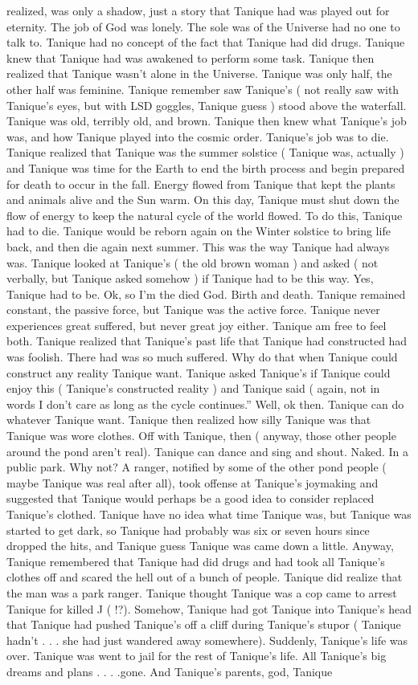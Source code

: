 \documentclass[12pt]{book}
\begin{document}
realized, was only a shadow, just a story that Tanique had was played out for eternity. The job of God was lonely. The sole was of the Universe had no one to talk to. Tanique had no concept of the fact that Tanique had did drugs. Tanique knew that Tanique had was awakened to perform some task. Tanique then realized that Tanique wasn't alone in the Universe. Tanique was only half, the other half was feminine. Tanique remember saw Tanique's ( not really saw with Tanique's eyes, but with LSD goggles, Tanique guess ) stood above the waterfall. Tanique was old, terribly old, and brown. Tanique then knew what Tanique's job was, and how Tanique played into the cosmic order. Tanique's job was to die. Tanique realized that Tanique was the summer solstice ( Tanique was, actually ) and Tanique was time for the Earth to end the birth process and begin prepared for death to occur in the fall. Energy flowed from Tanique that kept the plants and animals alive and the Sun warm. On this day, Tanique must shut down the flow of energy to keep the natural cycle of the world flowed. To do this, Tanique had to die. Tanique would be reborn again on the Winter solstice to bring life back, and then die again next summer. This was the way Tanique had always was. Tanique looked at Tanique's ( the old brown woman ) and asked ( not verbally, but Tanique asked somehow ) if Tanique had to be this way. Yes, Tanique had to be. Ok, so I'm the died God. Birth and death. Tanique remained constant, the passive force, but Tanique was the active force. Tanique never experiences great suffered, but never great joy either. Tanique am free to feel both. Tanique realized that Tanique's past life that Tanique had constructed had was foolish. There had was so much suffered. Why do that when Tanique could construct any reality Tanique want. Tanique asked Tanique's if Tanique could enjoy this ( Tanique's constructed reality ) and Tanique said ( again, not in words I don't care as long as the cycle continues.'' Well, ok then. Tanique can do whatever Tanique want. Tanique then realized how silly Tanique was that Tanique was wore clothes. Off with Tanique, then ( anyway, those other people around the pond aren't real). Tanique can dance and sing and shout. Naked. In a public park. Why not? A ranger, notified by some of the other pond people ( maybe Tanique was real after all), took offense at Tanique's joymaking and suggested that Tanique would perhaps be a good idea to consider replaced Tanique's clothed. Tanique have no idea what time Tanique was, but Tanique was started to get dark, so Tanique had probably was six or seven hours since dropped the hits, and Tanique guess Tanique was came down a little. Anyway, Tanique remembered that Tanique had did drugs and had took all Tanique's clothes off and scared the hell out of a bunch of people. Tanique did realize that the man was a park ranger. Tanique thought Tanique was a cop came to arrest Tanique for killed J ( !?). Somehow, Tanique had got Tanique into Tanique's head that Tanique had pushed Tanique's off a cliff during Tanique's stupor ( Tanique hadn't . . . she had just wandered away somewhere). Suddenly, Tanique's life was over. Tanique was went to jail for the rest of Tanique's life. All Tanique's big dreams and plans . . . .gone. And Tanique's parents, god, Tanique 
\end{document}

